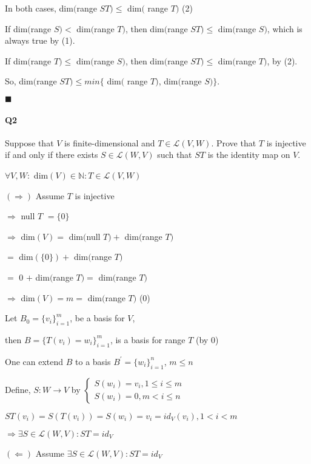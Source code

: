 \documentclass{article}
\begin{document}
In both cases, dim$($range $ST) \leq $ dim$($ range $T)$ (2)

If dim$($range $S) <$ dim$($range $T)$, then  dim$($range $ST) \leq$
dim$($range $S)$, which is always true by (1).

If dim$($range $T) \leq$ dim$($range $S)$, then  dim$($range $ST) \leq$
dim$($range $T)$, by (2).

So, dim$($range $ST) \leq min\{$ dim$($ range $T)$, dim$($range
$S)\}$.
\vspace{0.618 em}

$\blacksquare$


\newpage
\paragraph{Q2} Suppose that $V$ is finite-dimensional and $T\in \mathcal{L}(V, W )$. Prove
that $T$ is injective if and only if there exists $S\in \mathcal{L}(W,V)$ such that $ST$ is the identity map
on $V$.

\vspace{0.618 em}

$\forall V , W :$ dim$(V) \in \mathbb{N}: T\in \mathcal{L}(V, W)$

$(\Rightarrow)$ Assume $T$ is injective

$\Rightarrow$ null $T$ $= \{0\}$

$\Rightarrow$ dim$(V) =$ dim$($null $T) +$ dim$($range $T)$

$=$ dim$(\{0\}) +$ dim$($range $T)$

$=$ $ 0$ $+$ dim$($range $T) = $ dim$($range $T)$

$\Rightarrow$ dim$(V) = m =$ dim$($range $T)$ (0)

Let $B_0 = \{v_i\}_{i=1}^m$, be a basis for $V$,

then $B = \{T(v_i)=w_i\}_{i=1}^m$, is a basis for range $T$ (by 0)

One can extend $B$ to a basis $B^\prime = \{w_i\}_{i=1}^n$, $m \leq n$

Define, $S: W \rightarrow V$ by $\begin{cases}
  S(w_i) = v_i, 1 \leq i \leq m\\
  S(w_i) = 0, m < i \leq n
\end{cases}$

$ST(v_i) = S(T(v_i)) = S(w_i) = v_i = id_V(v_i), 1 < i < m$

$\Rightarrow \exists S \in \mathcal{L}(W,V): ST = id_V$

$(\Leftarrow)$ Assume $\exists S \in \mathcal{L}(W,V): ST = id_V$
\end{document}
